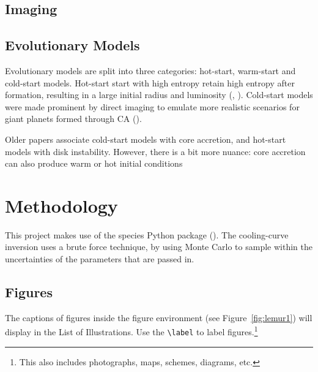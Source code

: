\documentclass[11pt]{report}
\begin{document}
\begin{mainf}
\section{Imaging}
\section{Evolutionary Models}
Evolutionary models are split into three categories: hot-start, warm-start and cold-start models. 
Hot-start start with high entropy retain high entropy after formation, resulting in a
large initial radius and luminosity (\citealp{Bowler2016a}, \citealp{Bussmann2026}). 
Cold-start models were made prominent by direct imaging to emulate more realistic scenarios for giant planets formed through CA (\citealp{Bowler2016a}).

Older papers associate cold-start models with core accretion,
and hot-start models with disk instability. However, there is a bit more nuance: core accretion can also produce warm or hot initial conditions

\chapter{Methodology}
This project makes use of the species Python package (\citealp{Stolker2020}). The cooling-curve inversion uses a brute force technique, by using Monte Carlo to
sample within the uncertainties of the parameters that are passed in.


\section{Figures}
The captions of figures inside the figure environment (see Figure~\ref{fig:lemur1}) will display in the List of Illustrations. Use the \Verb|\label| to label figures.\footnote{This also includes photographs, maps, schemes, diagrams, etc.}
\newpage

\end{mainf}
\end{document}
